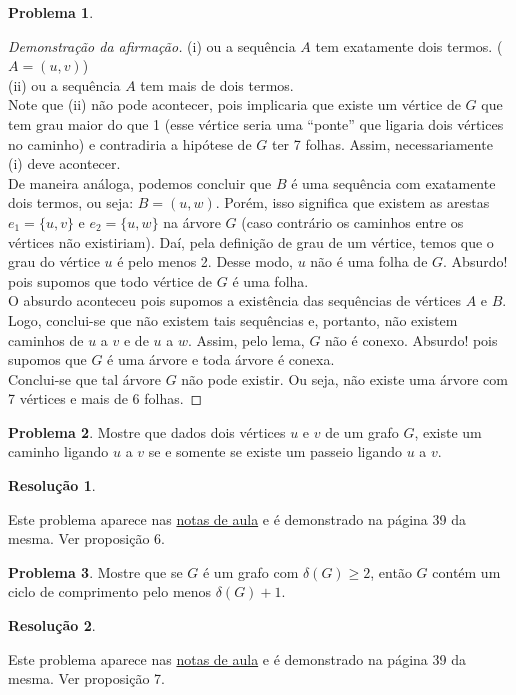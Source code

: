 \documentclass[12pt, a4paper]{article}
\theoremstyle{definition} \newtheorem{prob}{Problema}
\newtheorem*{res}{Resolução}
\begin{document}
\begin{prob}
\begin{proof}[Demonstração da afirmação]
(i) ou a sequência \(A\) tem exatamente dois termos. (\(A = (u,v)\)) \\

(ii) ou a sequência \(A\) tem mais de dois termos.  \\

Note que (ii) não pode acontecer, pois implicaria que existe um vértice de \(G\) que tem grau maior do que 1 (esse vértice seria uma ``ponte'' que ligaria dois vértices no caminho) e contradiria a hipótese de \(G\) ter 7 folhas. Assim, necessariamente (i) deve acontecer. \\

De maneira análoga, podemos concluir que \(B\) é uma sequência com exatamente dois termos, ou seja: \(B =(u,w)\). Porém, isso significa que existem as arestas \(e_1 = \{u,v\}\) e \(e_2 =\{u,w\}\) na árvore \(G\) (caso contrário os caminhos entre os vértices não existiriam). Daí, pela definição de grau de um vértice, temos que o grau do vértice \(u\) é pelo menos 2. Desse modo, \(u\) não é uma folha de \(G\). Absurdo! pois supomos que todo vértice de \(G\) é uma folha.\\

O absurdo aconteceu pois supomos a existência das sequências de vértices \(A\) e \(B\). Logo, conclui-se que não existem tais sequências e, portanto, não existem caminhos de \(u\) a \(v\) e de \(u\) a \(w\). Assim, pelo lema, \(G\) não é conexo. Absurdo! pois supomos que \(G\) é uma árvore e toda árvore é conexa. \\

Conclui-se que tal árvore \(G\) não pode existir. Ou seja, não existe uma árvore com 7 vértices e mais de 6 folhas.

\end{proof}

\dotfill

\end{prob}

\begin{prob} %
Mostre que dados dois vértices \(u\) e \(v\) de um grafo \(G\), existe um caminho ligando \(u\) a \(v\) se e somente se existe um passeio ligando \(u\) a \(v\).

\dotfill
\begin{res}
\end{res}
Este problema aparece nas \href{https://drive.google.com/file/d/16Gy9vck48p64A-3u1t2-uUVGOVqOlAOg/view}{notas de aula} e é demonstrado na página 39 da mesma. Ver proposição 6.

\end{prob}
\dotfill
\begin{prob} %
Mostre que se \(G\) é um grafo com \(\delta (G) \geq 2\), então \(G\) contém um ciclo de comprimento pelo menos \(\delta (G) +1\).

\dotfill
\begin{res}
\end{res}
Este problema aparece nas \href{https://drive.google.com/file/d/16Gy9vck48p64A-3u1t2-uUVGOVqOlAOg/view}{notas de aula} e é demonstrado na página 39 da mesma. Ver proposição 7.

\dotfill
\end{prob}
\end{document}
